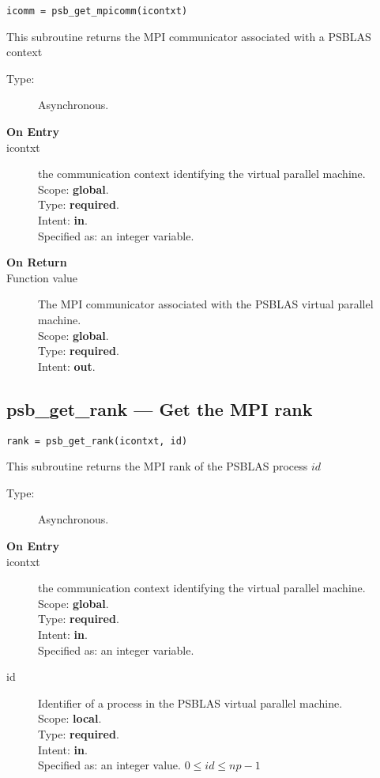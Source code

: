 \begin{verbatim}
icomm = psb_get_mpicomm(icontxt)
\end{verbatim}

This subroutine returns the MPI communicator associated with a PSBLAS context
\begin{description}
\item[Type:] Asynchronous.
\item[\bf  On Entry ]
\item[icontxt] the communication context identifying the virtual
  parallel machine.\\
Scope: {\bf global}.\\
Type: {\bf required}.\\
Intent: {\bf in}.\\
Specified as: an integer variable.
\end{description}

\begin{description}
\item[\bf On Return]
\item[Function value] The MPI communicator associated with the  PSBLAS virtual parallel machine.\\
Scope: {\bf global}.\\
Type: {\bf required}.\\
Intent: {\bf out}.\\
\end{description}


\clearpage\subsection*{psb\_get\_rank --- Get the MPI rank}

\begin{verbatim}
rank = psb_get_rank(icontxt, id)
\end{verbatim}

This subroutine returns the MPI rank of the  PSBLAS process $id$
\begin{description}
\item[Type:] Asynchronous.
\item[\bf  On Entry ]
\item[icontxt] the communication context identifying the virtual
  parallel machine.\\
Scope: {\bf global}.\\
Type: {\bf required}.\\
Intent: {\bf in}.\\
Specified as: an integer variable.
\item[id] Identifier of a   process in the PSBLAS virtual parallel machine.\\
Scope: {\bf local}.\\
Type: {\bf required}.\\
Intent: {\bf in}.\\
Specified as: an integer value. $0 \le id \le np-1$\
\end{description}

